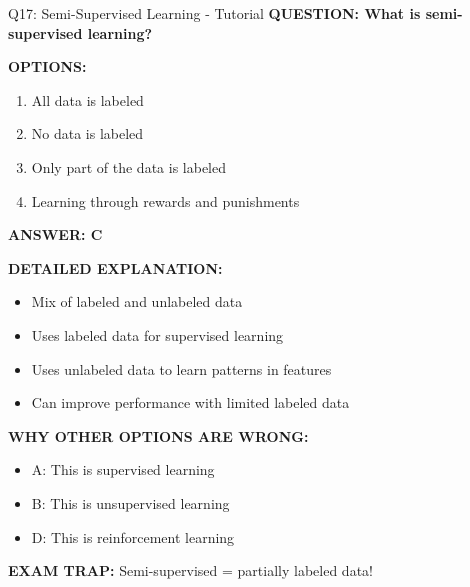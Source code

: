 \documentclass[8pt]{beamer}
\begin{document}
	\begin{frame}{Q17: Semi-Supervised Learning - Tutorial}
		\fontsize{6.5}{7.5}\selectfont
		\textbf{QUESTION: What is semi-supervised learning?}
		
		\vspace{0.1cm}
		\textbf{OPTIONS:}
		\begin{enumerate}
			\item All data is labeled
			\item No data is labeled
			\item Only part of the data is labeled
			\item Learning through rewards and punishments
		\end{enumerate}
		
		\vspace{0.1cm}
		\textcolor{myblue}{\textbf{ANSWER: C}}
		
		\vspace{0.1cm}
		\textbf{DETAILED EXPLANATION:}
		\begin{itemize}
			\item Mix of labeled and unlabeled data
			\item Uses labeled data for supervised learning
			\item Uses unlabeled data to learn patterns in features
			\item Can improve performance with limited labeled data
		\end{itemize}
		
		\vspace{0.1cm}
		\textcolor{myred}{\textbf{WHY OTHER OPTIONS ARE WRONG:}}
		\begin{itemize}
			\item \textcolor{myred}{A:} This is supervised learning
			\item \textcolor{myred}{B:} This is unsupervised learning
			\item \textcolor{myred}{D:} This is reinforcement learning
		\end{itemize}
		
		\textcolor{myred}{\textbf{EXAM TRAP:}} Semi-supervised = \textcolor{myblue}{partially labeled data}!
	\end{frame}
	
\end{document}

